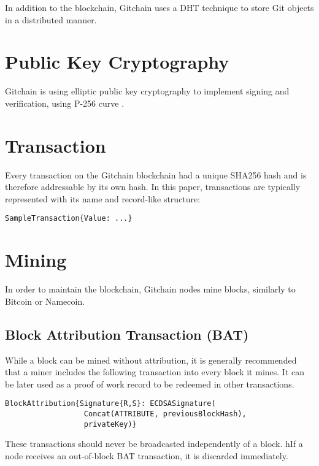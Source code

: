\documentclass[a4paper]{article}
\begin{document}
In addition to the blockchain, Gitchain uses a DHT technique to store Git objects in a distributed manner.

\section{Public Key Cryptography}

Gitchain is using elliptic public key cryptography to implement signing and verification, using P-256 curve .

\section{Transaction}

Every transaction on the Gitchain blockchain had a unique SHA256 hash and is therefore addressable by its own hash. In this paper, transactions are typically represented with its name and record-like structure:

\begin{verbatim}
SampleTransaction{Value: ...}
\end{verbatim}

\section{Mining}

In order to maintain the blockchain, Gitchain nodes mine blocks, similarly to Bitcoin or Namecoin.

\subsection{Block Attribution Transaction (BAT)}

While a block can be mined without attribution, it is generally recommended that a miner includes the following transaction into every block it mines. It can be later used as a proof of work record to be redeemed in other transactions.

\begin{verbatim}
BlockAttribution{Signature{R,S}: ECDSASignature(
                  Concat(ATTRIBUTE, previousBlockHash),
                  privateKey)}
\end{verbatim}

These transactions should never be broadcasted independently of a block. hIf a node receives an out-of-block BAT transaction, it is discarded immediately.
\end{document}
